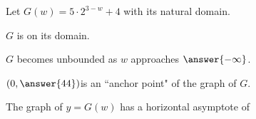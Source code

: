 \documentclass{ximera}
\author{Lee Wayand}
\begin{document}
\begin{exercise}




Let $G(w) = 5 \cdot 2^{3-w} + 4$ with its natural domain.


\begin{question}


$G$ is  on its domain. \\


\end{question}







\begin{question}


$G$ becomes unbounded as $w$ approaches $\answer{-\infty}$.


\end{question}





\begin{question}


$\left( 0, \answer{44} \right) $is an ``anchor point" of the graph of $G$. \\


\end{question}








\begin{question}


The graph of $y=G(w)$ has a horizontal asymptote of

\begin{multipleChoice}
\end{multipleChoice}


\end{question}








\end{exercise}
\end{document}
